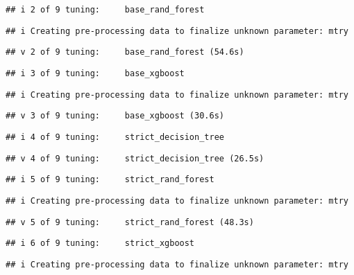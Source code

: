\documentclass[
]{article}
\begin{document}
\begin{verbatim}
## i 2 of 9 tuning:     base_rand_forest
\end{verbatim}

\begin{verbatim}
## i Creating pre-processing data to finalize unknown parameter: mtry
\end{verbatim}

\begin{verbatim}
## v 2 of 9 tuning:     base_rand_forest (54.6s)
\end{verbatim}

\begin{verbatim}
## i 3 of 9 tuning:     base_xgboost
\end{verbatim}

\begin{verbatim}
## i Creating pre-processing data to finalize unknown parameter: mtry
\end{verbatim}

\begin{verbatim}
## v 3 of 9 tuning:     base_xgboost (30.6s)
\end{verbatim}

\begin{verbatim}
## i 4 of 9 tuning:     strict_decision_tree
\end{verbatim}

\begin{verbatim}
## v 4 of 9 tuning:     strict_decision_tree (26.5s)
\end{verbatim}

\begin{verbatim}
## i 5 of 9 tuning:     strict_rand_forest
\end{verbatim}

\begin{verbatim}
## i Creating pre-processing data to finalize unknown parameter: mtry
\end{verbatim}

\begin{verbatim}
## v 5 of 9 tuning:     strict_rand_forest (48.3s)
\end{verbatim}

\begin{verbatim}
## i 6 of 9 tuning:     strict_xgboost
\end{verbatim}

\begin{verbatim}
## i Creating pre-processing data to finalize unknown parameter: mtry
\end{verbatim}
\end{document}
